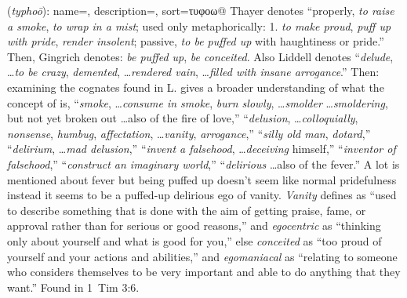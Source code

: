 \item[Egomaniacal,]

(\textit{typhoō}):
{
    name=,
    description={},
    sort=τυφοω@
}
Thayer denotes ``properly, \emph{to raise a smoke}, \emph{to wrap in a mist}; used only metaphorically:  1. \emph{to make proud}, \emph{puff up with pride}, \emph{render insolent}; passive, \emph{to be puffed up} with haughtiness or pride.'' Then, Gingrich denotes: \emph{be puffed up}, \emph{be conceited}. 
Also Liddell denotes  ``\emph{delude}, \ldots \emph{to be crazy}, \emph{demented}, \ldots \emph{rendered vain}, \ldots \emph{filled with insane arrogance}.''
Then: examining the cognates found in L. gives a broader understanding of what the concept of  is, 
 ``\emph{smoke}, \ldots \emph{consume in smoke}, \emph{burn slowly}, \ldots \emph{smolder} \ldots \emph{smoldering}, but not yet broken out \ldots also of the fire of love,''
 ``\emph{delusion}, \ldots \emph{colloquially}, \emph{nonsense}, \emph{humbug}, \emph{affectation}, \ldots \emph{vanity}, \emph{arrogance},''
 ``\emph{silly old man}, \emph{dotard},''
 ``\emph{delirium}, \ldots \emph{mad delusion},''
 ``\emph{invent a falsehood}, \ldots \emph{deceiving} himself,'' 
 ``\emph{inventor of falsehood},'' 
 ``\emph{construct an imaginary world},'' 
 ``\emph{delirious} \ldots also of the fever.'' 
A lot is mentioned about fever but being puffed up doesn't seem like normal pridefulness instead it seems to be a puffed-up delirious ego of vanity. \emph{Vanity} defines as ``used to describe something that is done with the aim of getting praise, fame, or approval rather than for serious or good reasons,'' and \emph{egocentric} as ``thinking only about yourself and what is good for you,'' else \emph{conceited} as ``too proud of yourself and your actions and abilities,'' and \emph{egomaniacal} as ``relating to someone who considers themselves to be very important and able to do anything that they want.''
Found in 1~Tim 3:6.
